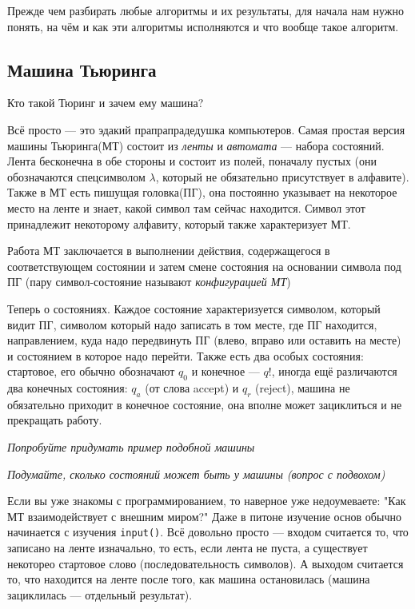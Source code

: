 Прежде чем разбирать любые алгоритмы и их результаты, для начала нам нужно понять, 
на чём и как эти алгоритмы исполняются и что вообще такое алгоритм.

\subsection*{Машина Тьюринга}

Кто такой Тюринг и зачем ему машина?

Всё просто --- это эдакий прапрапрадедушка компьютеров. Самая простая версия машины Тьюринга(МТ)
состоит из \textit{ленты} и \textit{автомата} --- набора состояний. Лента бесконечна
в обе стороны и состоит из полей, поначалу пустых (они обозначаются спецсимволом $\lambda$, который не обязательно
присутствует в алфавите). Также в МТ есть пишущая головка(ПГ), она
постоянно указывает на некоторое место на ленте и знает, какой символ там сейчас
находится. Символ этот принадлежит некоторому алфавиту, который также характеризует МТ.

Работа МТ заключается в выполнении действия, содержащегося в соответствующем состоянии и затем смене состояния
на основании символа под ПГ (пару символ-состояние называют \textit{конфигурацией МТ})

Теперь о состояниях. Каждое состояние характеризуется символом, который видит ПГ, символом который надо записать
в том месте, где ПГ находится, направлением, куда надо передвинуть ПГ (влево, вправо или оставить на месте) и
состоянием в которое надо перейти. Также есть два особых состояния: стартовое, его обычно обозначают $q_0$
и конечное --- $q!$, иногда ещё различаются два конечных состояния: $q_a$ (от слова accept) и $q_r$ (reject),
машина не обязательно приходит в конечное состояние, она вполне может зациклиться и не прекращать работу.

\textit{Попробуйте придумать пример подобной машины}

\textit{Подумайте, сколько состояний может быть у машины (вопрос с подвохом)}

Если вы уже знакомы с программированием, то наверное уже недоумеваете: "Как МТ взаимодействует с внешним миром?"
Даже в питоне изучение основ обычно начинается с изучения \verb*|input()|.
Всё довольно просто --- входом считается то, что записано на ленте изначально, то
есть, если лента не пуста, а существует некоторео стартовое слово (последовательность символов).
А выходом считается то, что находится на ленте после того, как машина остановилась (машина зациклилась --- отдельный результат).

